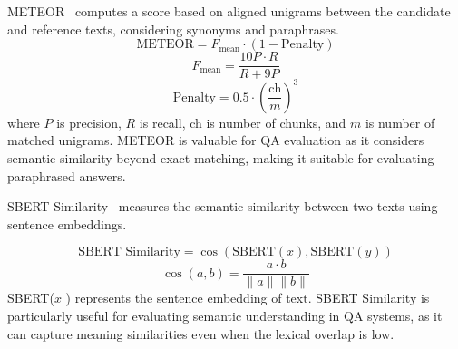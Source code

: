 \documentclass{article}
\begin{document}
METEOR~\cite{meteor} computes a score based on aligned unigrams between the candidate and reference texts, considering synonyms and paraphrases.
\begin{equation}
    \text{METEOR} = F_{\text{mean}} \cdot (1 - \text{Penalty})
\end{equation}
\begin{equation}
    F_{\text{mean}} = \frac{10P \cdot R}{R + 9P}
\end{equation} 
\begin{equation}
    \text{Penalty} = 0.5 \cdot (\frac{\text{ch}}{m})^3
\end{equation}
where \( P \) is precision, \( R \) is recall, ch is number of chunks, and \( m \) is number of matched unigrams. METEOR is valuable for QA evaluation as it considers semantic similarity beyond exact matching, making it suitable for evaluating paraphrased answers.

SBERT Similarity~\cite{sentence-bert} measures the semantic similarity between two texts using sentence embeddings. 

\begin{equation}
    \text{SBERT\_Similarity} = \cos(\text{SBERT}(x), \text{SBERT}(y))
\end{equation}
\begin{equation}
    \cos(a,b) = \frac{a \cdot b}{\|a\| \|b\|}
\end{equation}
SBERT(\( x \) ) represents the sentence embedding of text. SBERT Similarity is particularly useful for evaluating semantic understanding in QA systems, as it can capture meaning similarities even when the lexical overlap is low.
\end{document}
